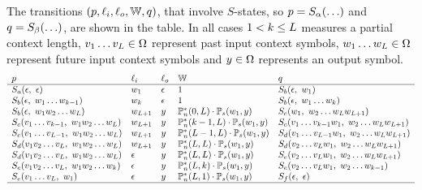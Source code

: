 \documentclass[english]{article}
\begin{document}
The transitions $(p, \ell_i, \ell_o, \mathbb{W}, q)$,
that involve $S$-states,
so $p = {S}_{\alpha}(\ldots)$ and $q = {S}_{\beta}(\ldots)$,
are shown in the table.
In all cases
$1 < k \leq L$ measures a partial context length,
$v_{1} \ldots v_{L} \in \Omega$ represent past input context symbols,
$w_{1} \ldots w_{L} \in \Omega$ represent future input context symbols and
$y \in \Omega$ represents an output symbol.
\[
\begin{array}{lllll}
\src & \inlab & \outlab & \weight & \dest \\
\hline
\symstate{a}(\emptystring,\ \emptystring) & \symnext_1 & \emptystring & 1 & \symstate{b}(\emptystring,\ \symnext_1) \\
\symstate{b}(\emptystring,\ \seqnextsyms{1}{k-1}) & \symnext_k & \emptystring & 1 & \symstate{b}(\emptystring,\ \seqnextsyms{1}{k}) \\
\symstate{b}(\emptystring,\ \symnext_1\seqnextsyms{2}{\contextlen}) & \symnext_{\contextlen+1} & \outsym & \pcont(0,\contextlen) \cdot \psubnext{1} & \symstate{c}(\symnext_1,\ \seqnextsyms{2}{\contextlen}\symnext_{\contextlen+1}) \\
\symstate{c}(\seqpastsyms{1}{k-1},\ \symnext_1\seqnextsyms{2}{\contextlen}) & \symnext_{\contextlen+1} & \outsym & \pcont(k-1,\contextlen) \cdot \psubnext{1} & \symstate{c}(\seqpastsyms{1}{k-1}\symnext_1,\ \seqnextsyms{2}{\contextlen}\symnext_{\contextlen+1}) \\
\symstate{c}(\seqpastsyms{1}{\contextlen-1},\ \symnext_1\seqnextsyms{2}{\contextlen}) & \symnext_{\contextlen+1} & \outsym & \pcont(\contextlen-1,\contextlen) \cdot \psubnext{1} & \symstate{d}(\seqpastsyms{1}{\contextlen-1}\symnext_1,\ \seqnextsyms{2}{\contextlen}\symnext_{\contextlen+1}) \\
\symstate{d}(\sympast_1\seqpastsyms{2}{\contextlen},\ \symnext_1\seqnextsyms{2}{\contextlen}) & \symnext_{\contextlen+1} & \outsym & \pcont(\contextlen,\contextlen) \cdot \psubnext{1} & \symstate{d}(\seqpastsyms{2}{\contextlen}\symnext_1,\ \seqnextsyms{2}{\contextlen}\symnext_{\contextlen+1}) \\
\symstate{d}(\sympast_1\seqpastsyms{2}{\contextlen},\ \symnext_1\seqnextsyms{2}{\contextlen}) & \emptystring & \outsym & \pcont(\contextlen,\contextlen) \cdot \psubnext{1} & \symstate{e}(\seqpastsyms{2}{\contextlen}\symnext_1,\ \seqnextsyms{2}{\contextlen}\symnext_{\contextlen+1}) \\
\symstate{e}(\sympast_1\seqpastsyms{2}{\contextlen},\ \symnext_1\seqnextsyms{2}{k}) & \emptystring & \outsym & \pcont(\contextlen,k) \cdot \psubnext{1} & \symstate{e}(\seqpastsyms{2}{\contextlen}\symnext_1,\ \seqnextsyms{2}{k-1}) \\
\symstate{e}(\seqpastsyms{1}{\contextlen},\ \symnext_1) & \emptystring & \outsym & \pcont(\contextlen,1) \cdot \psubnext{1} & \symstate{f}(\emptystring,\ \emptystring) \\
\hline
\end{array}
\]
\end{document}
